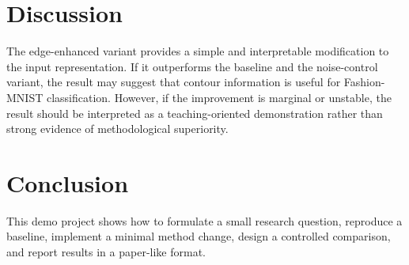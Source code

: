 \documentclass[10pt,conference]{IEEEtran}
\begin{document}
\section{Discussion}

The edge-enhanced variant provides a simple and interpretable modification to the input representation. If it outperforms the baseline and the noise-control variant, the result may suggest that contour information is useful for Fashion-MNIST classification. However, if the improvement is marginal or unstable, the result should be interpreted as a teaching-oriented demonstration rather than strong evidence of methodological superiority.

\section{Conclusion}

This demo project shows how to formulate a small research question, reproduce a baseline, implement a minimal method change, design a controlled comparison, and report results in a paper-like format.



\end{document}
